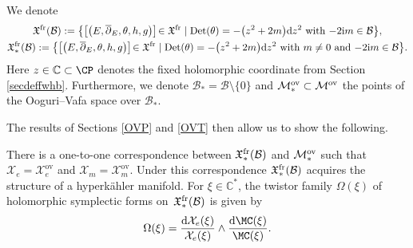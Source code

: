 \begin{Definition} We denote
\begin{gather*}
\mathfrak{X}^{\textnormal{fr}}(\mathcal{B}):=\bigl\{\bigl[\bigl(E,\overline{\partial}_E,\theta,h,g\bigr)\bigr] \!\in \mathfrak{X}^{\textnormal{fr}} \mid \operatorname{Det}(\theta)=-\bigl(z^2+2m\bigr){\rm d}z^2\ \text{with $-2{\rm i}m\in \mathcal{B}$}\bigr\},\\
 \mathfrak{X}^{\textnormal{fr}}_*(\mathcal{B}):=\bigl\{\bigl[\bigl(E,\overline{\partial}_E,\theta,h,g\bigr)\bigr]\! \in \mathfrak{X}^{\textnormal{fr}} \mid \operatorname{Det}(\theta)=-\bigl(z^2+2m\bigr){\rm d}z^2\ \text{with $m\neq 0$ and $-2{\rm i}m\in \mathcal{B}$}\bigr\}.
\end{gather*}
Here $z\in \mathbb{C}\subset \CP$ denotes the fixed holomorphic coordinate from Section \ref{secdeffwhb}. Furthermore, we denote $\mathcal{B}_*=\mathcal{B}\setminus\{0\}$ and $\mathcal{M}_*^{\textnormal{ov}} \subset \mathcal{M}^{\textnormal{ov}}$ the points of the Ooguri--Vafa space over $\mathcal{B}_*$.
\end{Definition}

The results of Sections \ref{OVP} and \ref{OVT} then allow us to show the following.

\begin{Theorem}\label{HKM} There is a one-to-one correspondence between $\mathfrak{X}^{\textnormal{fr}}_*(\mathcal{B})$ and $\mathcal{M}^{\textnormal{ov}}_*$ such that ${\mathcal{X}_e=\mathcal{X}_e^{\text{ov}}}$ and $\mathcal{X}_m=\mathcal{X}_m^{\text{ov}}$. Under this correspondence $\mathfrak{X}^{\textnormal{fr}}_*(\mathcal{B})$ acquires the structure of a hyperk\"ahler manifold. For $\xi \in \mathbb{C}^*$, the twistor family $\Omega(\xi)$ of holomorphic symplectic forms on~$\mathfrak{X}^{\textnormal{fr}}_*(\mathcal{B})$ is given by
\begin{equation}\label{familyholsym2}
 \Omega(\xi)=\frac{{\rm d}\mathcal{X}_e(\xi)}{\mathcal{X}_e(\xi)}\wedge \frac{{\rm d}\MC(\xi)}{\MC(\xi)}.
\end{equation}
\end{Theorem}

